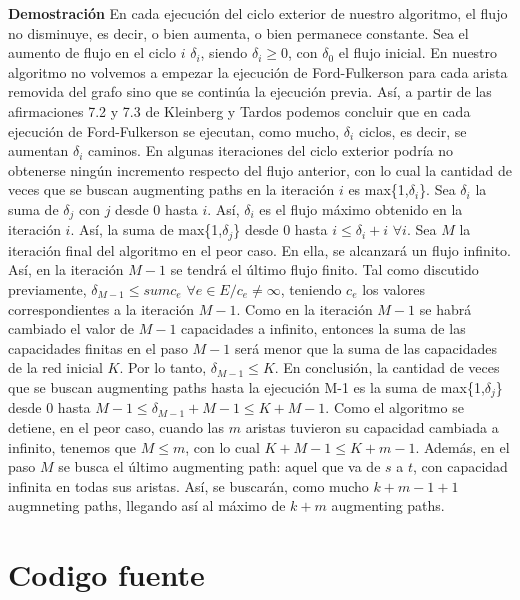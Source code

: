 \documentclass{article}
\begin{document}
\textbf{Demostración} En cada ejecución del ciclo exterior de nuestro algoritmo, el flujo no disminuye, es decir, o bien aumenta, o bien permanece constante. Sea el aumento de flujo en el ciclo $i$ $\delta_i$, siendo $\delta_i \geq 0$, con $\delta_0$ el flujo inicial. En nuestro algoritmo no volvemos a empezar la ejecución de Ford-Fulkerson para cada arista removida del grafo sino que se continúa la ejecución previa. Así, a partir de las afirmaciones 7.2 y 7.3 de Kleinberg y Tardos podemos concluir que en cada ejecución de Ford-Fulkerson se ejecutan, como mucho, $\delta_i$ ciclos, es decir, se aumentan $\delta_i$ caminos. En algunas iteraciones del ciclo exterior podría no obtenerse ningún incremento respecto del flujo anterior, con lo cual la cantidad de veces que se buscan augmenting paths en la iteración $i$ es max\{1,$\delta_i$\}. Sea $\delta_i$ la suma de $\delta_j$ con $j$ desde $0$ hasta $i$. Así, $\delta_i$ es el flujo máximo obtenido en la iteración $i$. Así, la suma de max\{1,$\delta_j$\} desde $0$ hasta $i \leq \delta_i + i$ $\forall i$. Sea $M$ la iteración final del algoritmo en el peor caso. En ella, se alcanzará un flujo infinito. Así, en la iteración $M-1$ se tendrá el último flujo finito. Tal como discutido previamente, $\delta_{M-1} \leq sum c_e$ $\forall e \in E / c_e \neq \infty$, teniendo $c_e$ los valores correspondientes a la iteración $M-1$. Como en la iteración $M-1$ se habrá cambiado el valor de $M-1$ capacidades a infinito, entonces la suma de las capacidades finitas en el paso $M-1$ será menor que la suma de las capacidades de la red inicial $K$. Por lo tanto, $\delta_{M-1}\leq K$. En conclusión, la cantidad de veces que se buscan augmenting paths hasta la ejecución M-1 es la suma de max\{1,$\delta_j$\} desde $0$ hasta $M-1 \leq \delta_{M-1} + M - 1 \leq K + M - 1$. Como el algoritmo se detiene, en el peor caso, cuando las $m$ aristas tuvieron su capacidad cambiada a infinito, tenemos que $M \leq m$, con lo cual $K+M-1 \leq K+m-1$. Además, en el paso $M$ se busca el último augmenting path: aquel que va de $s$ a $t$, con capacidad infinita en todas sus aristas. Así, se buscarán, como mucho $k+m-1+1$ augmneting paths, llegando así al máximo de $k+m$ augmenting paths.

\newpage

\part{Codigo fuente}











\end{document}
